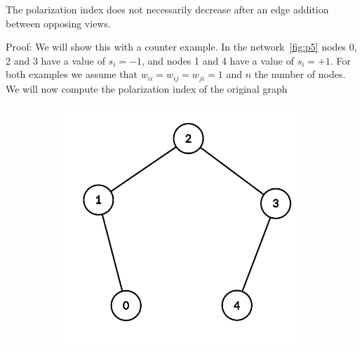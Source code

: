 \begin{lemma}
The polarization index does not necessarily decrease after an edge addition between opposing views.
\end{lemma}

\vspace{20pt}
\noindent Proof:  We will  show this with a counter example. In the network~\ref{fig:p5} nodes 0, 2 and 3 have a value of $s_i=-1$, and nodes 1 and 4 have a value of $s_i=+1$. For both examples we assume that $w_{ii}=w_{ij}=w_{ji}=1$ and $n$ the number of nodes. We will now compute the polarization index of the original graph
\\
\begin{figure}[h]
	\centering
	\begin{subfigure}[t]{0.3\textwidth}
		\centering
		\includegraphics[height=0.15\textheight]{Figures/p5A}
		\caption{}
		\label{subfig:monotonicityA}
	\end{subfigure}
	\hfill
	\begin{subfigure}[t]{0.3\textwidth}
		\centering

\end{subfigure}
\end{figure}
